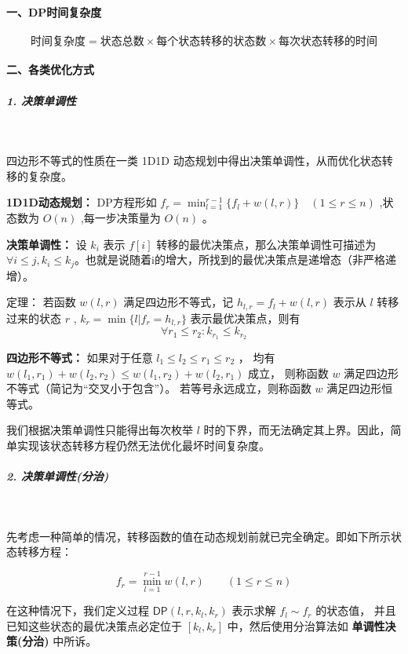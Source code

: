 \paragraph{一、DP时间复杂度}
$$
\text{时间复杂度} = \text{状态总数} \times \text{每个状态转移的状态数} \times \text{每次状态转移的时间}
$$

\paragraph{二、各类优化方式}
\subparagraph{1. 决策单调性}~{}
\par

四边形不等式的性质在一类 1D1D 动态规划中得出决策单调性，从而优化状态转移的复杂度。\par

\textbf{1D1D动态规划：} DP方程形如 $f_{r} = \min_{l=1}^{r-1}\{f_{l}+w(l,r)\}\quad\left(1 \leq r \leq n\right)$ 
,状态数为 $O(n)$ ,每一步决策量为 $O(n)$ 。\par

\textbf{决策单调性：} 设 $k_i$ 表示 $f[i]$ 转移的最优决策点，那么决策单调性可描述为 
$\forall i \leq j, k_i \leq k_j$。也就是说随着i的增大，所找到的最优决策点是递增态（非严格递增）。\par

定理： 若函数 $w(l,r)$ 满足四边形不等式，记 $h_{l,r}=f_l+w(l,r)$ 表示从 $l$ 转移过来的状态 $r$ , 
$k_{r}=\min\{l|f_{r}=h_{l,r}\}$ 表示最优决策点，则有$$\forall r_1 \leq r_2:k_{r_1} \leq k_{r_2}$$ \par

\textbf{四边形不等式：} 如果对于任意 $l_1\leq l_2 \leq r_1 \leq r_2$ ，
均有 $w(l_1,r_1)+w(l_2,r_2) \leq w(l_1,r_2) + w(l_2,r_1)$ 成立，
则称函数 $w$ 满足四边形不等式（简记为“交叉小于包含”）。
若等号永远成立，则称函数 $w$ 满足四边形恒等式。\par

我们根据决策单调性只能得出每次枚举 $l$ 时的下界，而无法确定其上界。因此，简单实现该状态转移方程仍然无法优化最坏时间复杂度。\par

\subparagraph{2. 决策单调性(分治)}~{}
\par

先考虑一种简单的情况，转移函数的值在动态规划前就已完全确定。即如下所示状态转移方程：

$$
f_{r} = \min_{l=1}^{r-1}w(l,r) \qquad\left(1 \leq r \leq n\right)
$$

在这种情况下，我们定义过程 $\textsf{DP}(l, r, k_l, k_r)$ 表示求解 $f_{l}\sim f_{r}$ 的状态值，
并且已知这些状态的最优决策点必定位于 $[k_l, k_r]$ 中，然后使用分治算法如 \textbf{单调性决策(分治)} 中所诉。 \par


